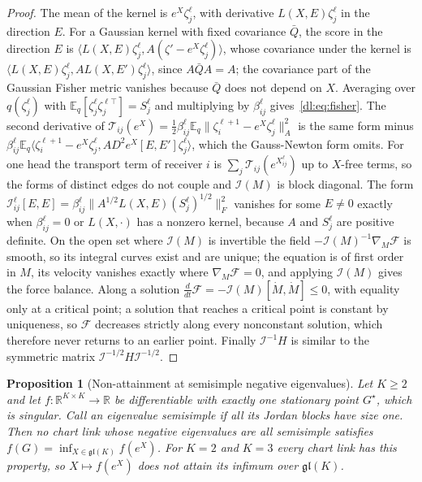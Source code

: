 \documentclass[11pt]{article}
\newtheorem{proposition}[theorem]{Proposition}
\theoremstyle{definition}
\theoremstyle{remark}
\providecommand{\gl}{\mathfrak{gl}}
\newcommand{\E}{\mathbb E}
\newcommand{\R}{\mathbb R}
\newcommand{\Qb}{\bar Q}
\begin{document}
\begin{proof}
The mean of the kernel is $e^X\zeta_j^\ell$, with derivative $L(X,E)\zeta_j^\ell$ in the direction $E$. For a Gaussian kernel with fixed covariance $\Qb$, the score in the direction $E$ is $\langle L(X,E)\zeta_j^\ell,A(\zeta'-e^X\zeta_j^\ell)\rangle$, whose covariance under the kernel is $\langle L(X,E)\zeta_j^\ell,AL(X,E')\zeta_j^\ell\rangle$, since $A\Qb A=A$; the covariance part of the Gaussian Fisher metric vanishes because $\Qb$ does not depend on $X$. Averaging over $q(\zeta_j^\ell)$ with $\E_q[\zeta_j^\ell\zeta_j^{\ell\top}]=S_j^\ell$ and multiplying by $\beta_{ij}^\ell$ gives~\eqref{dl:eq:fisher}. The second derivative of $\mathcal T_{ij}(e^X)=\tfrac12\beta_{ij}^\ell\E_q\|\zeta_i^{\ell+1}-e^X\zeta_j^\ell\|_A^2$ is the same form minus $\beta_{ij}^\ell\E_q\langle\zeta_i^{\ell+1}-e^X\zeta_j^\ell,AD^2e^X[E,E']\zeta_j^\ell\rangle$, which the Gauss-Newton form omits. For one head the transport term of receiver $i$ is $\sum_j\mathcal T_{ij}(e^{X_{ij}^\ell})$ up to $X$-free terms, so the forms of distinct edges do not couple and $\mathcal I(M)$ is block diagonal. The form $\mathcal I_{ij}^\ell[E,E]=\beta_{ij}^\ell\|A^{1/2}L(X,E)(S_j^\ell)^{1/2}\|_F^2$ vanishes for some $E\ne0$ exactly when $\beta_{ij}^\ell=0$ or $L(X,\cdot)$ has a nonzero kernel, because $A$ and $S_j^\ell$ are positive definite. On the open set where $\mathcal I(M)$ is invertible the field $-\mathcal I(M)^{-1}\nabla_M\mathcal F$ is smooth, so its integral curves exist and are unique; the equation is of first order in $M$, its velocity vanishes exactly where $\nabla_M\mathcal F=0$, and applying $\mathcal I(M)$ gives the force balance. Along a solution $\tfrac{d}{dt}\mathcal F=-\mathcal I(M)[\dot M,\dot M]\le0$, with equality only at a critical point; a solution that reaches a critical point is constant by uniqueness, so $\mathcal F$ decreases strictly along every nonconstant solution, which therefore never returns to an earlier point. Finally $\mathcal I^{-1}H$ is similar to the symmetric matrix $\mathcal I^{-1/2}H\mathcal I^{-1/2}$.
\end{proof}

\begin{proposition}[Non-attainment at semisimple negative eigenvalues]
\label{dl:prop:semisimple}
Let $K\ge2$ and let $f:\R^{K\times K}\to\R$ be differentiable with exactly one stationary point $G^\star$, which is singular. Call an eigenvalue semisimple if all its Jordan blocks have size one. Then no chart link whose negative eigenvalues are all semisimple satisfies $f(G)=\inf_{X\in\gl(K)}f(e^X)$. For $K=2$ and $K=3$ every chart link has this property, so $X\mapsto f(e^X)$ does not attain its infimum over $\gl(K)$.
\end{proposition}
\end{document}
